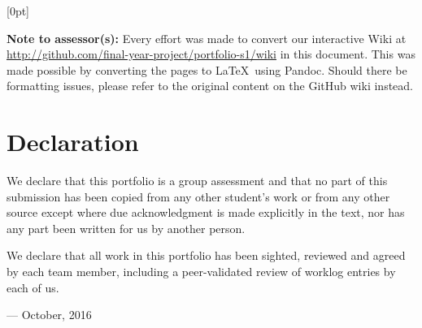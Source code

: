 %
%
\def \unitcode      {SWE40002}
\def \unitname      {Software Engineering Project B}


\usepackage{titletoc}
\linespread{1.5}

  [0pt]%
  {}%
  {\chaptername\ \thecontentslabel\quad}%
  {}%
  {\rmfamily \hfill\contentspage\\}%



\titlepagehere
\cleartoleftpage

\noindent
\textbf{Note to assessor(s):} Every effort was made to convert our interactive Wiki
at \url{http://github.com/final-year-project/portfolio-s1/wiki} in this document.
This was made possible by converting the pages to \LaTeX\ using Pandoc. Should there
be formatting issues, please refer to the original content on the GitHub wiki instead.

\cleartoleftpage

\section*{Declaration}

We declare that this portfolio is a group assessment and that no part of this
submission has been copied from any other student's work or from any other
source except where due acknowledgment is made explicitly in the text, nor has
any part been written for us by another person.

We declare that all work in this portfolio has been sighted, reviewed and agreed
by each team member, including a peer-validated review of worklog entries by
each of us.

\hfill --- October, 2016

\vspace{5em}

